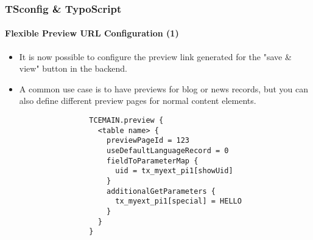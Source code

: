 %
\begin{frame}[fragile]
	\frametitle{TSconfig \& TypoScript}
	\framesubtitle{Flexible Preview URL Configuration (1)}

	\lstset{basicstyle=\tiny\ttfamily}

	\begin{itemize}

		\item It is now possible to configure the preview link generated for the\newline
			"save \& view" button in the backend.

		\item A common use case is to have previews for blog or news records, but you
			can also define different preview pages for normal content elements.

			\begin{lstlisting}
				TCEMAIN.preview {
				  <table name> {
				    previewPageId = 123
				    useDefaultLanguageRecord = 0
				    fieldToParameterMap {
				      uid = tx_myext_pi1[showUid]
				    }
				    additionalGetParameters {
				      tx_myext_pi1[special] = HELLO
				    }
				  }
				}
			\end{lstlisting}

	\end{itemize}

\end{frame}

